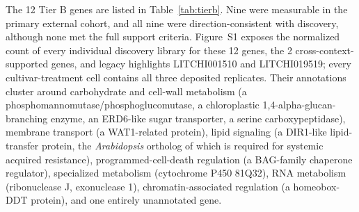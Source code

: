 \documentclass[11pt]{article}
\begin{document}
The 12 Tier B genes are listed in Table~\ref{tab:tierb}. Nine were measurable in the primary external cohort, and all nine were direction-consistent with discovery, although none met the full support criteria. Figure~S1 exposes the normalized count of every individual discovery library for these 12 genes, the 2 cross-context-supported genes, and legacy highlights LITCHI001510 and LITCHI019519; every cultivar-treatment cell contains all three deposited replicates. Their annotations cluster around carbohydrate and cell-wall metabolism (a phosphomannomutase/phosphoglucomutase, a chloroplastic 1,4-alpha-glucan-branching enzyme, an ERD6-like sugar transporter, a serine carboxypeptidase), membrane transport (a WAT1-related protein), lipid signaling (a DIR1-like lipid-transfer protein, the \textit{Arabidopsis} ortholog of which is required for systemic acquired resistance), programmed-cell-death regulation (a BAG-family chaperone regulator), specialized metabolism (cytochrome P450 81Q32), RNA metabolism (ribonuclease J, exonuclease 1), chromatin-associated regulation (a homeobox-DDT protein), and one entirely unannotated gene.
\end{document}
